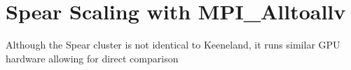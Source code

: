 %
%
%


\section{Spear Scaling with MPI\_Alltoallv}

Although the Spear cluster is not identical to Keeneland, it runs similar GPU hardware allowing for direct comparison


